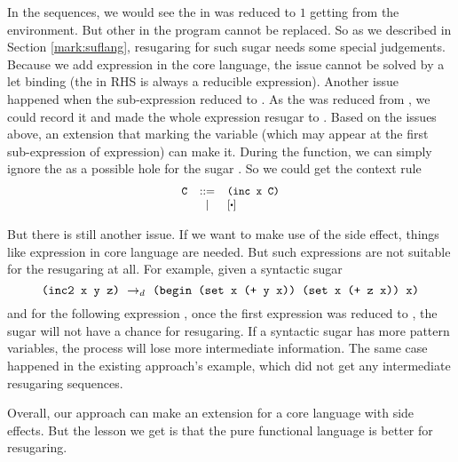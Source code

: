 In the sequences, we would see the  in  was reduced to $1$ getting from the environment. But other  in the program cannot be replaced. So as we described in Section \ref{mark:suflang}, resugaring for such sugar needs some special judgements. Because we add  expression in the core language, the issue cannot be solved by a let binding (the  in RHS is always a reducible expression).
Another issue happened when the sub-expression  reduced to . As the  was reduced from , we could record it and made the whole expression resugar to . Based on the issues above, an extension that marking the variable (which may appear at the first sub-expression of  expression) can make it. During the  function, we can simply ignore the  as a possible hole for the sugar . So we could get the context rule
\[
	{\small
	\begin{array}{lcl}
		\Code{C}&::=&\Code{(inc x C)}\\
		& | &[\bigcdot]
	\end{array}
	}
\]

But there is still another issue. If we want to make use of the side effect, things like  expression in core language are needed. But such expressions are not suitable for the resugaring at all. For example, given a syntactic sugar
\[\texttt{(inc2 x y z)} ~\rightarrow_d~ \texttt{(begin (set x (+ y x)) (set x (+ z x)) x)}\]
and for the following expression , once the first  expression was reduced to , the  sugar will not have a chance for resugaring. If a syntactic sugar has more pattern variables, the process will lose more intermediate information. The same case happened in the existing approach\cite{resugaring}'s  example, which did not get any intermediate resugaring sequences.

Overall, our approach can make an extension for a core language with side effects. But the lesson we get is that the pure functional language is better for resugaring.
